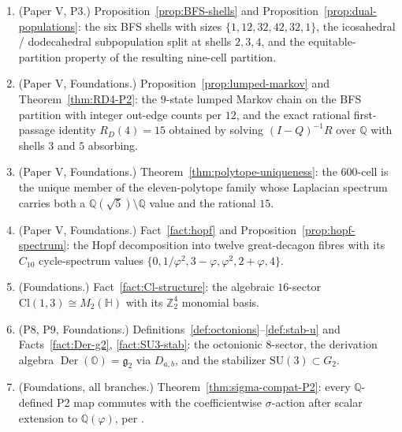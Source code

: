 \documentclass[11pt, a4paper]{amsart}
\theoremstyle{definition}
\newcommand{\Q}{\mathbb{Q}}
\newcommand{\Z}{\mathbb{Z}}
\newcommand{\HH}{\mathbb{H}}
\newcommand{\OO}{\mathbb{O}}
\newcommand{\Der}{\operatorname{Der}}
\newcommand{\Cl}{\mathrm{Cl}}
\newcommand{\SU}{\mathrm{SU}}
\begin{document}
\begin{enumerate}
  $600$-cell vertex graph with its isotypic multiplicities, and
  the resulting $W_{\mathrm{int}} \oplus W_{\mathrm{irr}} = 94 +
  26$ integer / irrational decomposition preserved by every
  polynomial in the shell-adjacency matrices. Downstream papers
  citing this item inherit the imported $2I$ character-table
  dependence recorded in \S\ref{sec:intro}; the invariance of the
  decomposition follows from
  Corollary~\ref{cor:class-sums-central} and is independent of
  the character-table step.
\item (Paper V, P3.) Proposition~\ref{prop:BFS-shells} and
  Proposition~\ref{prop:dual-populations}: the six BFS shells
  with sizes $\{1, 12, 32, 42, 32, 1\}$, the icosahedral /
  dodecahedral subpopulation split at shells $2, 3, 4$, and the
  equitable-partition property of the resulting nine-cell
  partition.
\item (Paper V, Foundations.)
  Proposition~\ref{prop:lumped-markov} and
  Theorem~\ref{thm:RD4-P2}: the $9$-state lumped Markov chain on
  the BFS partition with integer out-edge counts per $12$, and
  the exact rational first-passage identity $R_D(4) = 15$
  obtained by solving $(I - Q)^{-1} R$ over $\Q$ with shells $3$
  and $5$ absorbing.
\item (Paper V, Foundations.)
  Theorem~\ref{thm:polytope-uniqueness}: the $600$-cell is the
  unique member of the eleven-polytope family whose Laplacian
  spectrum carries both a $\Q(\sqrt 5) \setminus \Q$ value and
  the rational $15$.
\item (Paper V, Foundations.) Fact~\ref{fact:hopf} and
  Proposition~\ref{prop:hopf-spectrum}: the Hopf decomposition
  into twelve great-decagon fibres with its $C_{10}$
  cycle-spectrum values $\{0, 1/\varphi^2, 3-\varphi, \varphi^2,
  2+\varphi, 4\}$.
\item (Foundations.) Fact~\ref{fact:Cl-structure}: the algebraic
  $16$-sector $\Cl(1,3) \cong M_2(\HH)$ with its $\Z_2^4$ monomial
  basis.
\item (P8, P9, Foundations.)
  Definitions~\ref{def:octonions}--\ref{def:stab-u} and
  Facts~\ref{fact:Der-g2}, \ref{fact:SU3-stab}: the octonionic
  $8$-sector, the derivation algebra $\Der(\OO) =
  \mathfrak{g}_2$ via $D_{a, b}$, and the stabilizer $\SU(3)
  \subset G_2$.
\item (Foundations, all branches.) Theorem~\ref{thm:sigma-compat-P2}:
  every $\Q$-defined P2 map commutes with the coefficientwise
  $\sigma$-action after scalar extension to $\Q(\varphi)$, per
  \cite{SigmaRationality}.
\end{enumerate}
\end{document}
